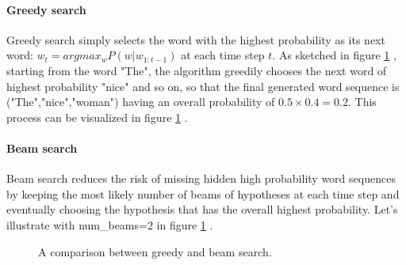 \paragraph{Greedy search} Greedy search simply selects the word with the highest probability as its next word: $w_t = argmax_{w}P(w | w_{1:t-1})$ at each time step $t$. As sketched in figure \ref{fig:greedy_beam_search} , starting from the word "The", the algorithm greedily chooses the next word of highest probability "nice" and so on, so that the final generated word sequence is ("The","nice","woman") having an overall probability of $0.5 \times 0.4=0.2$. This process can be visualized in figure \ref{fig:greedy_beam_search} .

\paragraph{Beam search} Beam search reduces the risk of missing hidden high probability word sequences by keeping the most likely number of beams of hypotheses at each time step and eventually choosing the hypothesis that has the overall highest probability. Let's illustrate with num\_beams=2 in figure \ref{fig:greedy_beam_search} .

\begin{figure}[H]
\centering
{} \qquad
{}
\caption{A comparison between greedy and beam search. \label{fig:greedy_beam_search}}
\end{figure}

